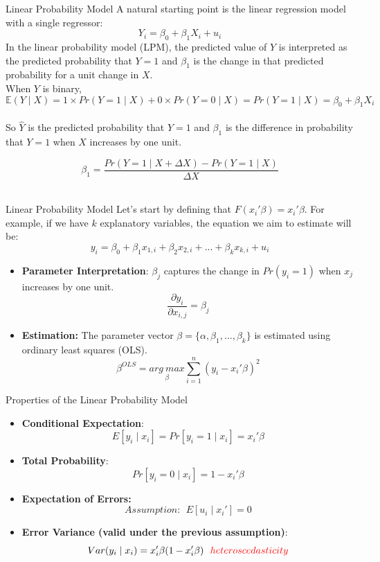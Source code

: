 \documentclass[notes,10pt, aspectratio=169]{beamer}
\begin{document}
\begin{frame}{Linear Probability Model}
A natural starting point is the linear regression model with a single regressor:
\begin{equation*}
    Y_i = \beta_0 + \beta_1 X_i +u_i
\end{equation*}
In the linear probability model (LPM), the predicted value of $Y$ is interpreted as the predicted probability that $Y=1$ and $\beta_1$ is the change in that predicted probability for a unit change in $X$.\\[1em]

When $Y$ is binary,
\begin{equation*}
    \mathbb{E}(Y\mid X) = 1 \times Pr(Y=1\mid X) + 0 \times  Pr(Y=0\mid X) = Pr(Y=1\mid X)= \beta_0 + \beta_1 X_i
\end{equation*}\\[1em]

So $\hat{Y}$ is the predicted probability that $Y=1$ and $\beta_1$ is the difference in probability that $Y=1$ when $X$ increases by one unit.

\begin{equation*}
    \beta_1 = \frac{Pr(Y=1\mid X + \Delta X)-Pr(Y=1\mid X)}{\Delta X}
\end{equation*}\\[1em]
\end{frame}


\begin{frame}{Linear Probability Model}
Let's start by defining that $F(x_i'\beta)=x_i'\beta$. For example, if we have $k$ explanatory variables, the equation we aim to estimate will be:
\[
y_i=\beta_0+\beta_1x_{1,i}+\beta_2x_{2,i}+...+\beta_kx_{k,i}+u_i
\]
\begin{itemize}
    \item \textbf{Parameter Interpretation}: $\beta_j$ captures the change in $Pr(y_i=1)$ when $x_j$ increases by one unit.
    \[\frac{\partial y_i}{\partial x_{i,j}}=\beta_j\]
    \item \textbf{Estimation:} The parameter vector $\beta=\{\alpha, \beta_1,...,\beta_k\}$ is estimated using ordinary least squares (OLS).
    \[
    \beta^{OLS} = \underset{\beta}{arg \ max } \sum_{i=1}^n (y_i-x_i'\beta)^2 
    \]
\end{itemize}
\end{frame}

\begin{frame}{Properties of the Linear Probability Model}
\begin{itemize}
    \item \textbf{Conditional Expectation}: 
    \[
    E[y_i \mid x_i]=Pr[y_i=1 \mid x_i]=x_i'\beta
    \]  
    \item \textbf{Total Probability}: 
    \[
    Pr[y_i=0 \mid x_i]=1-x_i'\beta
    \]
    \item \textbf{Expectation of Errors:}
    \[
    Assumption: \ \ E[u_i \mid x_i']=0 
    \]
    \item \textbf{Error Variance (valid under the previous assumption)}: 
    \[
    Var(y_i \mid x_i)=x_i'\beta(1-x_i'\beta){\color{red} \ \ heteroscedasticity}
    \]
\end{itemize}
\end{frame}
\end{document}
